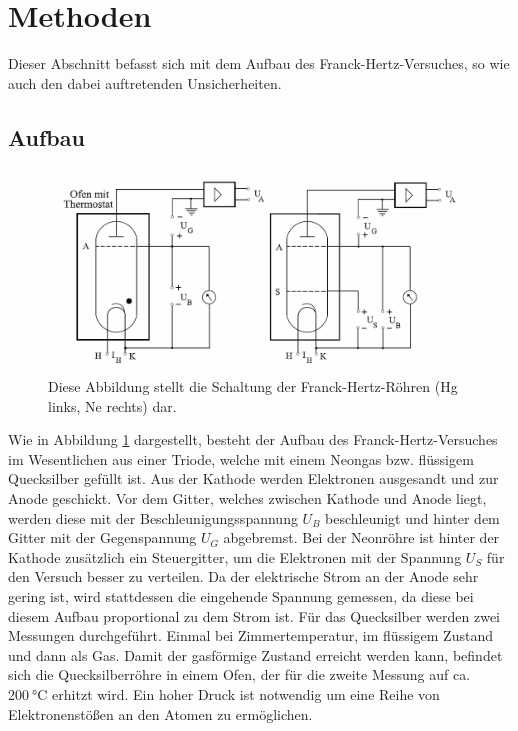 \section{Methoden}
	
	Dieser Abschnitt befasst sich mit dem Aufbau des Franck-Hertz-Versuches, so wie auch den dabei auftretenden Unsicherheiten.
	
	\subsection{Aufbau}		
		\begin{figure}[ht]
			\centering
			\includegraphics[width=\textwidth]{bilder/Aufbau.png}
			\caption{Diese Abbildung stellt die Schaltung der Franck-Hertz-Röhren (Hg links, Ne rechts) dar. \cite{WWU}}
			\label{fig:Aufbau}	
		\end{figure}	
		Wie in Abbildung \ref{fig:Aufbau} dargestellt, besteht der Aufbau des Franck-Hertz-Versuches im Wesentlichen aus einer Triode, welche mit einem Neongas bzw. flüssigem Quecksilber gefüllt ist. 
		Aus der Kathode werden Elektronen ausgesandt und zur Anode geschickt.		
		Vor dem Gitter, welches zwischen Kathode und Anode liegt, werden diese mit der Beschleunigungsspannung	$U_B$ beschleunigt und hinter dem Gitter mit der Gegenspannung $U_G$ abgebremst.
		Bei der Neonröhre ist hinter der Kathode zusätzlich ein Steuergitter, um die Elektronen mit der Spannung $U_S$ für den Versuch besser zu verteilen.
		Da der elektrische Strom an der Anode sehr gering ist, wird stattdessen die eingehende Spannung gemessen, da diese bei diesem Aufbau proportional zu dem Strom ist.
		Für das Quecksilber werden zwei Messungen durchgeführt.
		Einmal bei Zimmertemperatur, im flüssigem Zustand und dann als Gas. 
		Damit der gasförmige Zustand erreicht werden kann, befindet sich die Quecksilberröhre in einem Ofen, der für die zweite Messung auf ca. $\SI{200}{\celsius}$ erhitzt wird.
		Ein hoher Druck ist notwendig um eine Reihe von Elektronenstößen an den Atomen zu ermöglichen.
		

